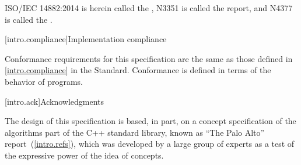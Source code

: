 ISO/IEC 14882:2014 is herein called the , N3351 is called the
 report, and N4377 is called the .

[intro.compliance]{Implementation compliance}

\pnum
Conformance requirements for this specification are the same as those
defined in \ref{intro.compliance} in the \Cpp Standard.
\enternote
Conformance is defined in terms of the behavior of programs.
\exitnote

[intro.ack]{Acknowledgments}

\pnum
The design of this specification is based, in part, on a concept
specification of the algorithms part of the C++ standard library, known
as ``The Palo Alto'' report~(\ref{intro.refs}), which was developed by a large
group of experts as a test of the expressive power of the idea of
concepts.
